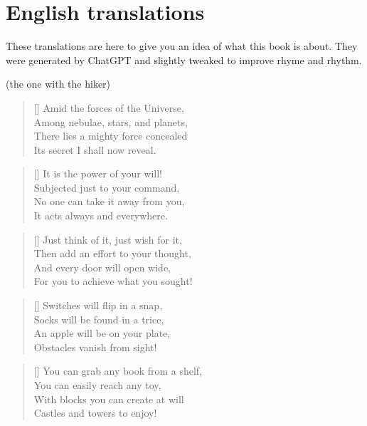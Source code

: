 \section*{English translations}
These translations are here to give you an idea of what this book is about. They were generated by ChatGPT and slightly tweaked to improve rhyme and rhythm.


\PlainPoemTitle
{}
\vspace{-5mm}
\begin{center}
	(the one with the hiker)
\end{center}

\begin{multicols}{2}
	
	
	\begin{verse}[\versewidth]
		Amid the forces of the Universe,\\
		Among nebulae, stars, and planets,\\
		There lies a mighty force concealed\\
		Its secret I shall now reveal.
	\end{verse}
	
	\begin{verse}[\versewidth]
		It is the power of your will!\\
		Subjected just to your command,\\
		No one can take it away from you,\\
		It acts always and everywhere.
	\end{verse}
	
	\begin{verse}[\versewidth]
		Just think of it, just wish for it,\\
		Then add an effort to your thought,\\
		And every door will open wide,\\
		For you to achieve what you sought!
	\end{verse}
	
	
	\begin{verse}[\versewidth]
		Switches will flip in a snap,\\
		Socks will be found in a trice,\\
		An apple will be on your plate,\\
		Obstacles vanish from sight!
	\end{verse}
	
	\begin{verse}[\versewidth]
		You can grab any book from a shelf,\\
		You can easily reach any toy,\\
		With blocks you can create at will\\
		Castles and towers to enjoy!
	\end{verse}
	

\end{multicols}
